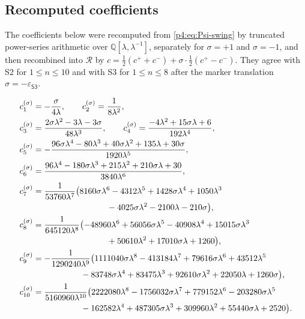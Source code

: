 \documentclass[11pt,a4paper,oneside]{book}
\theoremstyle{plain}
\theoremstyle{definition}
\theoremstyle{remark}
\newcommand{\Rat}{\mathbb{Q}}
\begin{document}
\subsection{Recomputed coefficients}

The coefficients below were recomputed from \cref{p4:eq:Psi-swing} by
truncated power-series arithmetic over $\Rat[\lambda,\lambda^{-1}]$,
separately for $\sigma=+1$ and $\sigma=-1$, and then recombined into
$\mathscr R$ by
$c=\tfrac12(c^{+}+c^{-})+\sigma\cdot\tfrac12(c^{+}-c^{-})$.  They agree with
\textsf{S2} for $1\le n\le10$ and with \textsf{S3} for $1\le n\le8$ after the
marker translation $\sigma=-\varepsilon_{\textsf{S3}}$.

\begin{align}
  c_1^{(\sigma)}&=-\frac{\sigma}{4\lambda},
  \qquad
  c_2^{(\sigma)}=\frac1{8\lambda^{2}},
  \label{p4:eq:c12}\\
  c_3^{(\sigma)}&=\frac{2\sigma\lambda^{2}-3\lambda-3\sigma}{48\lambda^{3}},
  \qquad
  c_4^{(\sigma)}=\frac{-4\lambda^{2}+15\sigma\lambda+6}{192\lambda^{4}},
  \label{p4:eq:c34}\\
  c_5^{(\sigma)}&=-\frac{96\sigma\lambda^{4}-80\lambda^{3}
    +40\sigma\lambda^{2}+135\lambda+30\sigma}{1920\lambda^{5}},
  \label{p4:eq:c5}\\
  c_6^{(\sigma)}&=\frac{96\lambda^{4}-180\sigma\lambda^{3}+215\lambda^{2}
    +210\sigma\lambda+30}{3840\lambda^{6}},
  \label{p4:eq:c6}\\
  c_7^{(\sigma)}&=\frac{1}{53760\lambda^{7}}\bigl(
    8160\sigma\lambda^{6}-4312\lambda^{5}+1428\sigma\lambda^{4}
    +1050\lambda^{3}\nonumber\\
   &\hspace{31mm}{}-4025\sigma\lambda^{2}-2100\lambda-210\sigma\bigr),
  \label{p4:eq:c7}\\
  c_8^{(\sigma)}&=\frac{1}{645120\lambda^{8}}\bigl(
    -48960\lambda^{6}+56056\sigma\lambda^{5}-40908\lambda^{4}
    +15015\sigma\lambda^{3}\nonumber\\
   &\hspace{31mm}{}+50610\lambda^{2}+17010\sigma\lambda+1260\bigr),
  \label{p4:eq:c8}\\
  c_9^{(\sigma)}&=-\frac{1}{1290240\lambda^{9}}\bigl(
    1111040\sigma\lambda^{8}-413184\lambda^{7}+79616\sigma\lambda^{6}
    +43512\lambda^{5}\nonumber\\
   &\hspace{20mm}{}-83748\sigma\lambda^{4}+83475\lambda^{3}
    +92610\sigma\lambda^{2}+22050\lambda+1260\sigma\bigr),
  \label{p4:eq:c9}\\
  c_{10}^{(\sigma)}&=\frac{1}{5160960\lambda^{10}}\bigl(
    2222080\lambda^{8}-1756032\sigma\lambda^{7}+779152\lambda^{6}
    -203280\sigma\lambda^{5}\nonumber\\
   &\hspace{20mm}{}-162582\lambda^{4}+487305\sigma\lambda^{3}
    +309960\lambda^{2}+55440\sigma\lambda+2520\bigr).
  \label{p4:eq:c10}
\end{align}
\end{document}
